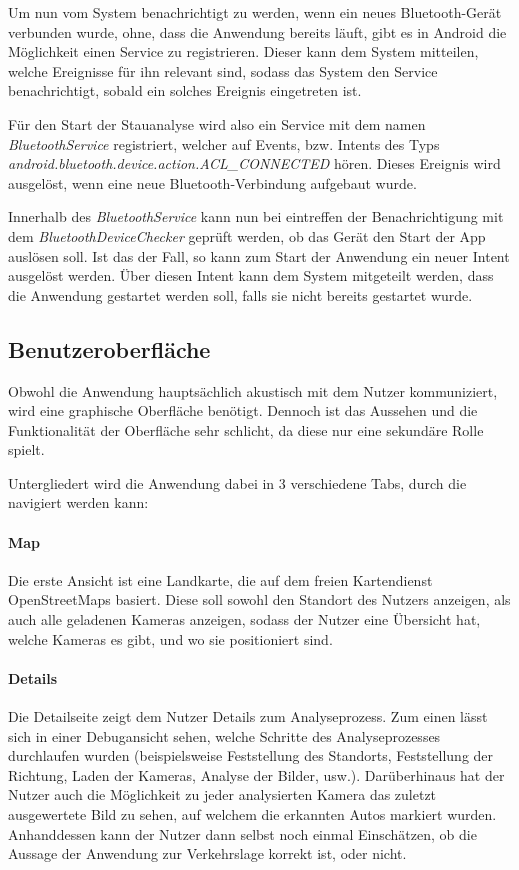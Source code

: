Um nun vom System benachrichtigt zu werden, wenn ein neues Bluetooth-Gerät verbunden wurde, ohne, dass die Anwendung bereits läuft, gibt es in Android die Möglichkeit einen Service zu registrieren.
Dieser kann dem System mitteilen, welche Ereignisse für ihn relevant sind, sodass das System den Service benachrichtigt, sobald ein solches Ereignis eingetreten ist.

Für den Start der Stauanalyse wird also ein Service mit dem namen {\em BluetoothService} registriert, welcher auf Events, bzw. Intents des Typs {\em android.bluetooth.device.action.ACL\_CONNECTED} hören. Dieses Ereignis wird ausgelöst, wenn eine neue Bluetooth-Verbindung aufgebaut wurde.

Innerhalb des {\em BluetoothService} kann nun bei eintreffen der Benachrichtigung mit dem {\em BluetoothDeviceChecker} geprüft werden, ob das Gerät den Start der App auslösen soll. Ist das der Fall, so kann zum Start der Anwendung ein neuer Intent ausgelöst werden. Über diesen Intent kann dem System mitgeteilt werden, dass die Anwendung gestartet werden soll, falls sie nicht bereits gestartet wurde.

\subsection{Benutzeroberfläche}
Obwohl die Anwendung hauptsächlich akustisch mit dem Nutzer kommuniziert, wird eine graphische Oberfläche benötigt.
Dennoch ist das Aussehen und die Funktionalität der Oberfläche sehr schlicht, da diese nur eine sekundäre Rolle spielt.

Untergliedert wird die Anwendung dabei in 3 verschiedene Tabs, durch die navigiert werden kann:

\paragraph*{Map}
Die erste Ansicht ist eine Landkarte, die auf dem freien Kartendienst OpenStreetMaps basiert. %
Diese soll sowohl den Standort des Nutzers anzeigen, als auch alle geladenen Kameras anzeigen, sodass der Nutzer eine Übersicht hat,
welche Kameras es gibt, und wo sie positioniert sind.

\paragraph*{Details}
Die Detailseite zeigt dem Nutzer Details zum Analyseprozess.
Zum einen lässt sich in einer Debugansicht sehen, welche Schritte des Analyseprozesses durchlaufen wurden (beispielsweise Feststellung des Standorts, Feststellung der Richtung, Laden der Kameras, Analyse der Bilder, usw.).
Darüberhinaus hat der Nutzer auch die Möglichkeit zu jeder analysierten Kamera das zuletzt ausgewertete Bild zu sehen, auf welchem die erkannten Autos markiert wurden. Anhanddessen kann der Nutzer dann selbst noch einmal Einschätzen, ob die Aussage der Anwendung zur Verkehrslage korrekt ist, oder nicht.

